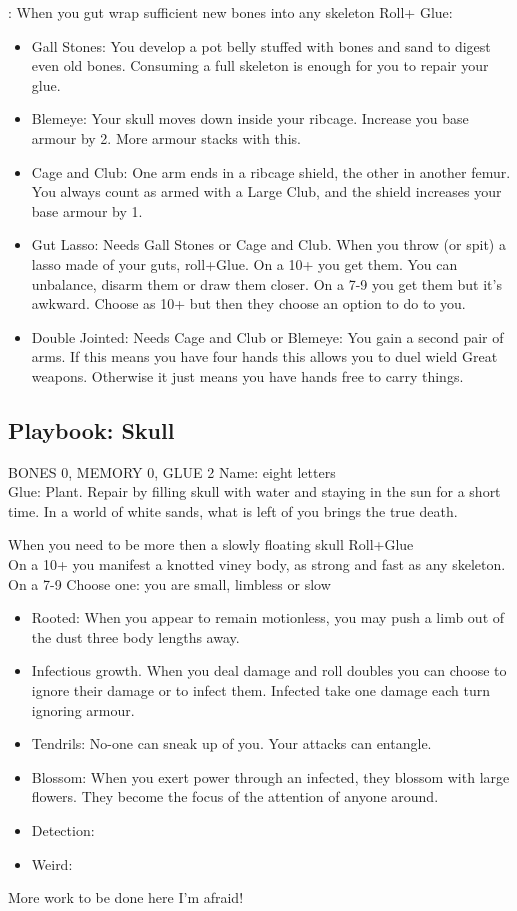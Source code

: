 : When you gut wrap sufficient new bones into any skeleton Roll+ Glue: 
\begin{itemize}
\myitem On a 10+ heal 3 or heal someone else 3 
\myitemend On a 7-9 as 10+ but reduce glue to zero until repaired
\item  Gall Stones: You develop a pot belly stuffed with bones and sand to digest even old bones. Consuming a full skeleton is enough for you to repair your glue.
\item  Blemeye: Your skull moves down inside your ribcage. Increase you base armour by 2. More armour stacks with this.
\item  Cage and Club: One arm ends in a ribcage shield, the other in another femur. You always count as armed with a Large Club, and the shield increases your base armour by 1. 
\item  Gut Lasso: Needs Gall Stones or Cage and Club. When you throw (or spit) a lasso made of your guts, roll+Glue.
\myitem On a 10+ you get them. You can unbalance, disarm them or draw them closer.
\myitemend On a 7-9 you get them but it's awkward. Choose as 10+ but then they choose an option to do to you.
\item  Double Jointed: Needs Cage and Club or Blemeye: You gain a second pair of arms. If this means you have four hands this allows you to duel wield Great weapons. Otherwise it just means you have hands free to carry things.
\end{itemize}

\newpage
\subsection{Playbook: Skull}
BONES 0, MEMORY 0, GLUE 2  
Name: eight letters 
\\ Glue: Plant. Repair by filling skull with water and staying in the sun for a short time.
In a world of white sands, what is left of you brings the true death. 

 When you need to be more then a slowly floating skull Roll+Glue
\\On a 10+ you manifest a knotted viney body, as strong and fast as any skeleton.
\\On a 7-9 Choose one: you are small, limbless or slow
\begin{itemize}
\item  Rooted: When you appear to remain motionless, you may push a limb out of the dust three body lengths away.
\item  Infectious growth. When you deal damage and roll doubles you can choose to ignore their damage or to infect them. Infected take one damage each turn ignoring armour.
\item  Tendrils: No-one can sneak up of you. Your attacks can entangle.
\item  Blossom: When you exert power through an infected, they blossom with large flowers. They become the focus of the attention of anyone around.
\item  Detection: 
\item  Weird:
\end{itemize}

More work to be done here I'm afraid!
